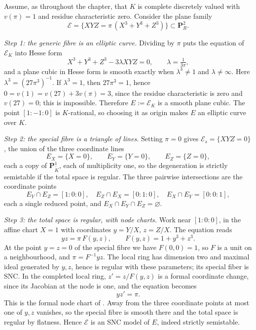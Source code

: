 \begin{example}
\label{ex:tate-degeneration}
Assume, as throughout the chapter, that $K$ is complete discretely valued
with $v(\pi)=1$ and residue characteristic zero. Consider the plane
family
\[
 \mathcal E=\bigl\{XYZ=\pi\,(X^3+Y^3+Z^3)\bigr\}\subset\mathbf P^2_R .
\]

\emph{Step 1: the generic fibre is an elliptic curve.} Dividing by $\pi$
puts the equation of $\mathcal E_K$ into Hesse form
\[
 X^3+Y^3+Z^3-3\lambda XYZ=0,\qquad \lambda=\tfrac1{3\pi},
\]
and a plane cubic in Hesse form is smooth exactly when
$\lambda^3\neq1$ and $\lambda\neq\infty$. Here
$\lambda^3=(27\pi^3)^{-1}$.  If $\lambda^3=1$, then $27\pi^3=1$, hence
$0=v(1)=v(27)+3v(\pi)=3$, since the residue characteristic is zero and
$v(27)=0$; this is impossible. Therefore $E:=\mathcal E_K$ is a smooth
plane cubic. The point $[1:-1:0]$ is $K$-rational, so choosing it as
origin makes $E$ an elliptic curve over $K$.

\emph{Step 2: the special fibre is a triangle of lines.} Setting $\pi=0$
gives $\mathcal E_s=\{XYZ=0\}$, the union of the three coordinate lines
\[
 E_X=\{X=0\},\qquad E_Y=\{Y=0\},\qquad E_Z=\{Z=0\},
\]
each a copy of $\mathbf P^1_{\widetilde K}$, each of multiplicity one, so
the degeneration is strictly semistable if the total space is regular. The
three pairwise intersections are the coordinate points
\[
 E_Y\cap E_Z=[1:0:0],\quad E_Z\cap E_X=[0:1:0],\quad
 E_X\cap E_Y=[0:0:1],
\]
each a single reduced point, and $E_X\cap E_Y\cap E_Z=\varnothing$.

\emph{Step 3: the total space is regular, with node charts.} Work near
$[1:0:0]$, in the affine chart $X=1$ with coordinates $y=Y/X$,
$z=Z/X$. The equation reads
\[
 yz=\pi\,F(y,z),\qquad F(y,z)=1+y^3+z^3 .
\]
At the point $y=z=0$ of the special fibre we have $F(0,0)=1$, so $F$
is a unit on a neighbourhood, and $\pi=F^{-1}yz$. The local ring has
dimension two and maximal ideal generated by $y,z$, hence is regular with
these parameters; its special fiber is SNC. In the completed local ring,
$z'=z/F(y,z)$ is a formal coordinate change, since its Jacobian at the
node is one, and the equation becomes
\[
                         yz'=\pi .
\]
This is the formal node chart of . Away from
the three coordinate points at most one of $y,z$ vanishes, so the special
fibre is smooth there and the total space is regular by flatness. Hence
$\mathcal E$ is an SNC model of $E$, indeed strictly semistable.


\end{example}
